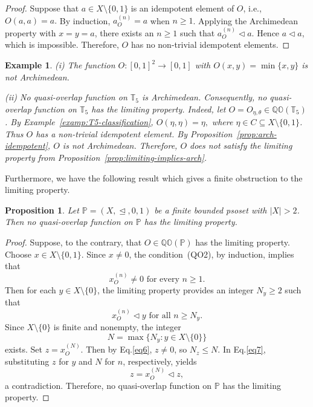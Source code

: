 \documentclass[preprint,12pt]{elsarticle}
\newtheorem{proposition}[theorem]{Proposition}
\newtheorem{example}[theorem]{Example}
\begin{document}
\begin{proof}
Suppose that $a\in X\setminus\{0,1\}$ is an idempotent element of $O$, i.e., $O(a,a)=a.$ By induction, $a_O^{(n)}=a$ when $n\ge1$.
Applying the Archimedean property with $x=y=a$, there exists an $n\ge1$ such that
$
 a_O^{(n)}\triangleleft a.
$
Hence $a\triangleleft a$, which is impossible. Therefore, $O$ has no non-trivial idempotent elements.
\end{proof}

\begin{example}\label{cor:T5-not-arch}
\emph{(i) The function $O:[0,1]^2\to [0,1]$ with $O(x,y)=\min\{x,y\}$ is not Archimedean.}

\emph{(ii) No quasi-overlap function on $\mathbb{T}_5$ is Archimedean. Consequently, no quasi-overlap function on $\mathbb{T}_5$ has the limiting property. Indeed, let $O=O_{\eta,\theta}\in\mathbb{QO}(\mathbb{T}_5)$. By Example~\ref{examp:T5-classification},
$
 O(\eta,\eta)=\eta,
$
where $\eta\in C\subseteq X\setminus\{0,1\}$. Thus $O$ has a non-trivial idempotent element. By Proposition~\ref{prop:arch-idempotent}, $O$ is not Archimedean. Therefore, $O$ does not satisfy the limiting property from Proposition~\ref{prop:limiting-implies-arch}.}
\end{example}

Furthermore, we have the following result which gives a finite obstruction to the limiting property.
\begin{proposition}\label{prop:finite-no-limiting}
Let $\mathbb{P}=(X,\trianglelefteq,0,1)$ be a finite bounded psoset with $|X|>2$. Then no quasi-overlap function on $\mathbb{P}$ has the limiting property.
\end{proposition}

\begin{proof}
Suppose, to the contrary, that $O\in\mathbb{QO}(\mathbb{P})$ has the limiting property. Choose $x\in X\setminus\{0,1\}$. Since $x\neq0$, the condition~(QO2), by induction, implies that
\begin{equation}\label{eq6}
x_O^{(n)}\neq0\mbox{ for every }n\ge1.
\end{equation}
Then for each $y\in X\setminus\{0\}$, the limiting property provides an integer $N_y\ge2$ such that
\begin{equation}\label{eq7}
x_O^{(n)}\triangleleft y
\mbox{ for all }n\ge N_y.
\end{equation}
Since $X\setminus\{0\}$ is finite and nonempty, the integer
$$
N=\max\{N_y:y\in X\setminus\{0\}\}
$$
exists. Set $z=x_O^{(N)}$. Then by Eq.\eqref{eq6}, $z\neq0$, so $N_z\le N$. In Eq.\eqref{eq7}, substituting $z$ for $y$ and $N$ for $n$, respectively, yields
$$
z=x_O^{(N)}\triangleleft z,
$$
a contradiction. Therefore, no quasi-overlap function on $\mathbb{P}$ has the limiting property.
\end{proof}
\end{document}
